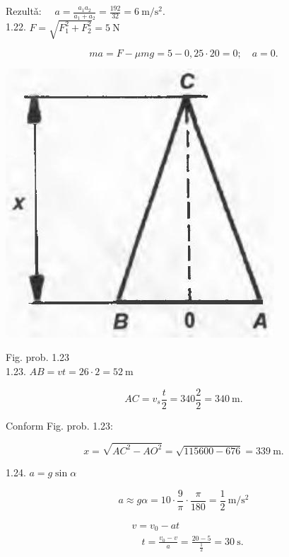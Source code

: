 \documentclass[10pt]{article}
\begin{document}
Rezultǎ: $\quad a=\frac{a_{1} a_{2}}{a_{1}+a_{2}}=\frac{192}{32}=6 \mathrm{~m} / \mathrm{s}^{2}$.\\
1.22. $F=\sqrt{F_{1}^{2}+F_{2}^{2}}=5 \mathrm{~N}$

$$
m a=F-\mu m g=5-0,25 \cdot 20=0 ; \quad a=0 .
$$

\begin{center}
\includegraphics[max width=\textwidth]{2025_07_01_5b3ff9fa0d508c8e9f17g-202}
\end{center}

Fig. prob. 1.23\\
1.23. $A B=v t=26 \cdot 2=52 \mathrm{~m}$

$$
A C=v_{s} \frac{t}{2}=340 \frac{2}{2}=340 \mathrm{~m} .
$$

Conform Fig. prob. 1.23:

$$
x=\sqrt{A C^{2}-A O^{2}}=\sqrt{115600-676}=339 \mathrm{~m} .
$$

1.24. $a=g \sin \alpha$

$$
a \approx g \alpha=10 \cdot \frac{9}{\pi} \cdot \frac{\pi}{180}=\frac{1}{2} \mathrm{~m} / \mathrm{s}^{2}
$$

$$
\begin{aligned}
& v=v_{0}-a t \\
& \quad t=\frac{v_{0}-v}{a}=\frac{20-5}{\frac{1}{2}}=30 \mathrm{~s} .
\end{aligned}
$$
\end{document}
